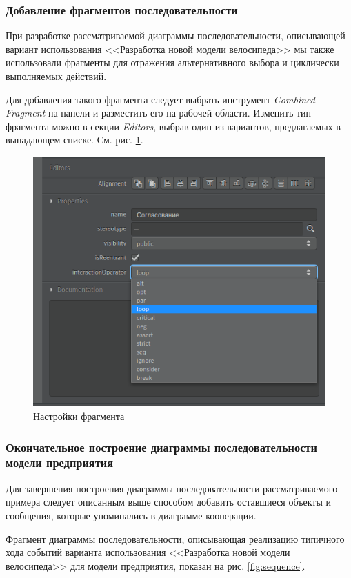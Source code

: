 \documentclass[a4paper,12pt]{report}
\begin{document}
\subsubsection*{Добавление фрагментов последовательности}

При разработке рассматриваемой диаграммы последовательности, описывающей вариант использования <<Разработка новой модели велосипеда>> мы также использовали фрагменты для отражения альтернативного выбора и циклически выполняемых действий.

Для добавления такого фрагмента следует выбрать инструмент \textit{Combined Fragment} на панели и разместить его на рабочей области. 
Изменить тип фрагмента можно в секции \textit{Editors}, выбрав один из вариантов, предлагаемых в выпадающем списке. См. рис. \ref{fig:sequenceeditors2}.

\begin{figure}[h!]
	\centering
	\includegraphics[width=0.5\linewidth]{images/sequenceeditors2}
	\caption{Настройки фрагмента}
	\label{fig:sequenceeditors2}
\end{figure}

\subsubsection*{Окончательное построение диаграммы последовательности модели предприятия}
Для завершения построения диаграммы последовательности рассматриваемого примера следует описанным выше способом добавить оставшиеся объекты и сообщения, которые упоминались в диаграмме кооперации.

Фрагмент диаграммы последовательности, описывающая реализацию типичного хода событий варианта использования <<Разработка новой модели велосипеда>> для модели предприятия, показан на рис. \ref{fig:sequence}.
\end{document}
